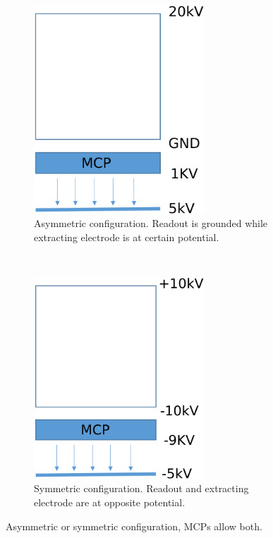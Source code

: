 \begin{figure}[!ht]
  \begin{subfigure}[t]{0.5\textwidth}
    \centering
    \includegraphics[width=0.7\textwidth]{04_IPHI_Test/figures/fig000_setup_hv_asym}
    \caption{Asymmetric configuration.
    Readout is grounded while extracting electrode is at certain potential.}
    \label{chap4:setup_hv_asym}
  \end{subfigure}
  ~
  \begin{subfigure}[t]{0.5\textwidth}
    \centering
    \includegraphics[width=0.7\textwidth]{04_IPHI_Test/figures/fig000_setup_hv_sym}
    \caption{Symmetric configuration. Readout and extracting electrode are at opposite potential.}
    \label{chap4:setup_hv_sym}
  \end{subfigure}
  \caption[Asymmetric or symmetric configuration]{Asymmetric or symmetric configuration, MCPs allow both.}
  \label{chap4:setup_hv}
\end{figure}